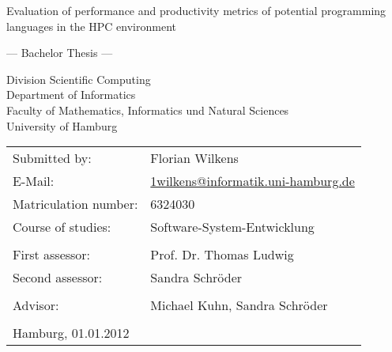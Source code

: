 \documentclass[
	12pt,
	a4paper,
	BCOR10mm,
	DIV14,
	listof=totoc,
	bibliography=totoc,
	headsepline
]{scrreprt}
\begin{document}
\begin{titlepage}
	\begin{center}
		{\titlefont\huge Evaluation of performance and productivity metrics of
			potential programming languages in the HPC environment \par}

		\bigskip
		\bigskip

		{\titlefont\Large --- Bachelor Thesis ---\par}

		\bigskip
		\bigskip

		{\large Division Scientific Computing \\
		Department of Informatics \\
		Faculty of Mathematics, Informatics und Natural Sciences \\
		University of Hamburg\par}
	\end{center}

	\vfill

	{\large \begin{tabular}{ll}
		Submitted by: & Florian Wilkens \\
		E-Mail: & \href{mailto:1wilkens@informatik.uni-hamburg.de}
			{1wilkens@informatik.uni-hamburg.de} \\
		Matriculation number: & 6324030 \\
		Course of studies: & Software-System-Entwicklung \\
		\\
		First assessor: & Prof. Dr. Thomas Ludwig \\
		Second assessor: & Sandra Schr\"oder \\ \\
		Advisor: & Michael Kuhn, Sandra Schr\"oder \\
		\\
		Hamburg, 01.01.2012
	\end{tabular}\par}
\end{titlepage}



\tableofcontents 				  %






\end{document}
